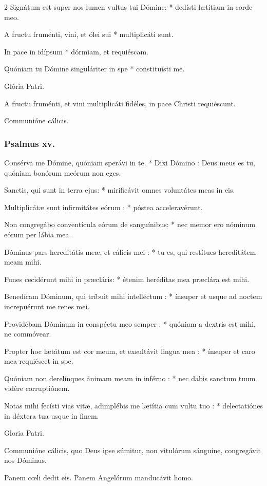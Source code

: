 \documentclass[9pt,twoside]{extarticle}
\begin{document}
\begin{multicols}{2}
Signátum est super nos lumen vultus tui Dómine: * dedísti lætítiam in corde meo.

A fructu fruménti, vini, et ólei sui * multiplicáti sunt.

In pace in idípsum * dórmiam, et requiéscam.

Quóniam tu Dómine singuláriter in spe * constituísti me.

Glória Patri.

\begin{tightlist}{}
\item {} A fructu fruménti, et vini multiplicáti fidéles, in pace Christi requiéscunt.
\item {} Communióne cálicis.
\end{tightlist}
\subsubsection*{\center Psalmus xv.}
\lettrine{C}onsérva me Dómine, quóniam sperávi in te. * Dixi Dómino : Deus meus es tu, quóniam bonórum meórum non eges.

Sanctis, qui sunt in terra ejus: * mirificávit omnes voluntátes meas in eis.

Multiplicátæ sunt infirmitátes eórum : * póstea acceleravérunt.

Non congregábo conventícula eórum de sanguínibus: * nec memor ero nóminum eórum per lábia mea.

Dóminus pars hereditátis meæ, et cálicis mei : * tu es, qui restítues hereditátem meam mihi.

Funes cecidérunt mihi in præcláris: * étenim heréditas mea præclára est mihi.

Benedícam Dóminum, qui tríbuit mihi intelléctum : * ínsuper et usque ad noctem increpuérunt me renes mei.

Providébam Dóminum in conspéctu meo semper : * quóniam a dextris est mihi, ne commóvear.

Propter hoc lætátum est cor meum, et exsultávit lingua mea : * ínsuper et caro mea requiéscet in spe.

Quóniam non derelínques ánimam meam in inférno : * nec dabis sanctum tuum vidére corruptiónem.

Notas mihi fecísti vias vitæ, adimplébis me lætítia cum vultu tuo : * delectatiónes in déxtera tua usque in finem.

Gloria Patri.

\begin{tightlist}{}
\item {} Communióne cálicis, quo Deus ipse súmitur, non vitulórum sánguine, congregávit nos Dóminus.
\item {} Panem cœli dedit eis.  Panem Angelórum manducávit homo.
\item {}
\end{tightlist}


\end{multicols}
\end{document}
